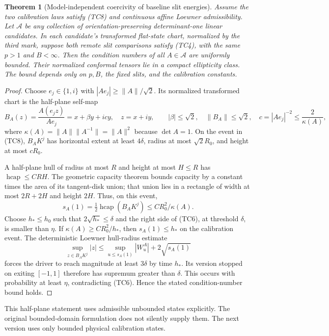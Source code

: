\documentclass[11pt]{article}
\newtheorem{theorem}{Theorem}[section]
\theoremstyle{definition}\newtheorem{definition}[theorem]{Definition}
\theoremstyle{remark}\newtheorem{remark}[theorem]{Remark}
\begin{document}
\begin{theorem}[Model-independent coercivity of baseline slit energies]
\label{thm:baseline-affine-coercivity}
Assume the two calibration laws satisfy (TC8) and continuous affine
Loewner admissibility. Let $\mathcal A$ be any collection of
orientation-preserving determinant-one linear candidates. In each
candidate's transformed flat-state chart, normalized by the third
mark, suppose both remote slit comparisons satisfy (TC4), with the
same $p>1$ and $B<\infty$. Then the condition numbers of all
$A\in\mathcal A$ are uniformly bounded. Their normalized conformal
tensors lie in a compact ellipticity class. The bound depends only on
$p,B$, the fixed slits, and the calibration constants.
\end{theorem}
\begin{proof}
Choose $e_j\in\{1,i\}$ with $|Ae_j|\ge\|A\|/\sqrt2$. Its
normalized transformed chart is the half-plane self-map
\[
 B_A(z)=\frac{A(e_jz)}{Ae_j}=x+\beta y+icy,
 \quad z=x+iy,
 \qquad |\beta|\le\sqrt2,\quad \|B_A\|\le\sqrt2,
 \quad c=|Ae_j|^{-2}\le\frac2{\kappa(A)},
 \tag{TC9}
\]
where $\kappa(A)=\|A\|\|A^{-1}\|=\|A\|^2$ because $\det A=1$.
On the event in (TC8), $B_AK^j$ has horizontal extent at least
$4\delta$, radius at most $\sqrt2R_0$, and height at most $cR_0$.

A half-plane hull of radius at most $R$ and height at most $H\le R$
has $\operatorname{hcap}\le CRH$. The geometric capacity theorem
\cite[Theorem 1]{lln-capacity} bounds capacity by a constant times
the area of its tangent-disk union; that union lies in a rectangle
of width at most $2R+2H$ and height $2H$. Thus, on this event,
\[
 s_A(1)=\tfrac12\operatorname{hcap}(B_AK^j)
                     \le CR_0^2/\kappa(A).
 \tag{TC10}
\]
Choose $h_*\le h_0$ such that $2\sqrt{h_*}\le\delta$ and the
right side of (TC6), at threshold $\delta$, is smaller than $\eta$.
If $\kappa(A)\ge CR_0^2/h_*$, then $s_A(1)\le h_*$ on the
calibration event. The deterministic Loewner hull-radius estimate
\[
 \sup_{z\in B_AK^j}|z|
     \le\sup_{u\le s_A(1)}|W_u^A|+2\sqrt{s_A(1)}
\]
forces the driver to reach magnitude at least $3\delta$ by time
$h_*$. Its version stopped on exiting $[-1,1]$ therefore has
supremum greater than $\delta$. This occurs with probability at
least $\eta$, contradicting (TC6). Hence the stated condition-number
bound holds.
\end{proof}

This half-plane statement uses admissible unbounded states explicitly.
The original bounded-domain formulation does not silently supply them.
The next version uses only bounded physical calibration states.
\end{document}
